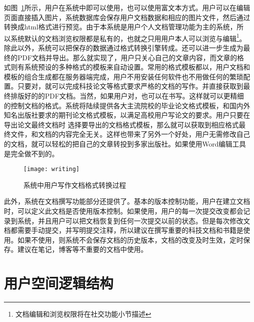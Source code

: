 如图~\ref{fig:xfig10}所示，用户在系统中即可以使用，也可以使用富文本方式。用户可以在编辑页面直接插入图片，系统数据库会保存用户文档数据和相应的图片文件，然后通过转换成html格式进行预览。由于本系统是用户个人文档管理功能为主的系统，所以系统默认的文档浏览权限都是私有的，也就之只用用户本人可以浏览与编辑\footnote{文档编辑和浏览权限将在社交功能小节描述}。除此以外，系统可以把保存的数据通过格式转换引擎转成。还可以进一步生成为最终的PDF文档并导出。那么就实现了，用户只关心自己的文章内容，而文章的格式则有系统预设的多种格式的模板来自动设置。常用的格式模板都以，用户文档和模板的组合生成都在服务器端完成，用户不用安装任何软件也不用做任何的繁琐配置。只要对，就可以完成科技论文等格式要求严格的文档的写作。并直接获取到最终排版好的的PDF文档。当然，如果用户对，也可以在书写。这样就可以更精细的控制文档的格式。系统将陆续提供各大主流院校的毕业论文格式模板，和国内外知名出版社要求的期刊论文格式模板，以满足高校用户写论文的要求。用户只要在导出论文最终文档时 选择要导出的文档格式模板，那么就可以获取到相应格式最终文件，和文档的内容完全无关。这样也带来了另外一个好处，用户无需修改自己的文档，就可以轻松的把自己的文章转投到多家出版社。如果使用Word编辑工具是完全做不到的。
\begin{figure}[H]
  \centering
  \texttt{[image: writing]}
  \caption{系统中用户写作文档格式转换过程}
  \label{fig:xfig10}
\end{figure}

此外，系统在文档撰写功能部分还提供了。基本的版本控制功能，用户在建立文档时，可以定义此文档是否使用版本控制。如果使用，用户的每一次提交改变都会记录到系统，并且用户可以把文档恢复到任何一次提交以前的状态。但是每次修改文档都需要手动提交，并写明提交注释，所以建议在撰写重要的科技文档和书籍是使用。如果不使用，则系统不会保存文档的历史版本，文档的改变及时生效，定时保存。建议在笔记，博客等不重要的文档中使用。

\section{用户空间逻辑结构}
\label{sec:personstructure}


